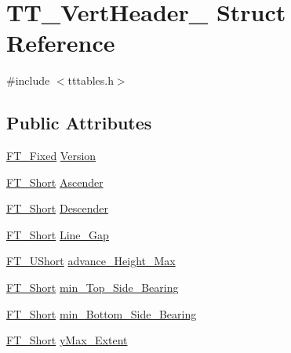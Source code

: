 \hypertarget{struct_t_t___vert_header__}{}\section{T\+T\+\_\+\+Vert\+Header\+\_\+ Struct Reference}
\label{struct_t_t___vert_header__}


{\ttfamily \#include $<$tttables.\+h$>$}

\subsection*{Public Attributes}
\begin{DoxyCompactItemize}
\item 
\mbox{\hyperlink{fttypes_8h_a5f5a679cc09f758efdd0d1c5feed3c3d}{F\+T\+\_\+\+Fixed}} \mbox{\hyperlink{struct_t_t___vert_header___a32d736621b757e9a39a15f2f82d15b9c}{Version}}
\item 
\mbox{\hyperlink{fttypes_8h_aa7279be89046a2563cd3d4d6651fbdcf}{F\+T\+\_\+\+Short}} \mbox{\hyperlink{struct_t_t___vert_header___afa95848b08d1fc8bd6bfe7e639e2895c}{Ascender}}
\item 
\mbox{\hyperlink{fttypes_8h_aa7279be89046a2563cd3d4d6651fbdcf}{F\+T\+\_\+\+Short}} \mbox{\hyperlink{struct_t_t___vert_header___afeeb8f6c759a76d655f24f1d58f1cf35}{Descender}}
\item 
\mbox{\hyperlink{fttypes_8h_aa7279be89046a2563cd3d4d6651fbdcf}{F\+T\+\_\+\+Short}} \mbox{\hyperlink{struct_t_t___vert_header___a8a6ad9f251e12e6701ebe53d19a65aa5}{Line\+\_\+\+Gap}}
\item 
\mbox{\hyperlink{fttypes_8h_a937f6c17cf5ffd09086d8610c37b9f58}{F\+T\+\_\+\+U\+Short}} \mbox{\hyperlink{struct_t_t___vert_header___a7a2acbd1abd4cc4d6f40110203f99d0f}{advance\+\_\+\+Height\+\_\+\+Max}}
\item 
\mbox{\hyperlink{fttypes_8h_aa7279be89046a2563cd3d4d6651fbdcf}{F\+T\+\_\+\+Short}} \mbox{\hyperlink{struct_t_t___vert_header___a10d78594a56f0966ae1d7b60138fbec2}{min\+\_\+\+Top\+\_\+\+Side\+\_\+\+Bearing}}
\item 
\mbox{\hyperlink{fttypes_8h_aa7279be89046a2563cd3d4d6651fbdcf}{F\+T\+\_\+\+Short}} \mbox{\hyperlink{struct_t_t___vert_header___a21422639a4cfd8dcdc9ebb3795676292}{min\+\_\+\+Bottom\+\_\+\+Side\+\_\+\+Bearing}}
\item 
\mbox{\hyperlink{fttypes_8h_aa7279be89046a2563cd3d4d6651fbdcf}{F\+T\+\_\+\+Short}} \mbox{\hyperlink{struct_t_t___vert_header___af6927e95c1dfbe90c2e76b1eef521d53}{y\+Max\+\_\+\+Extent}}
\item 

\end{DoxyCompactItemize}
